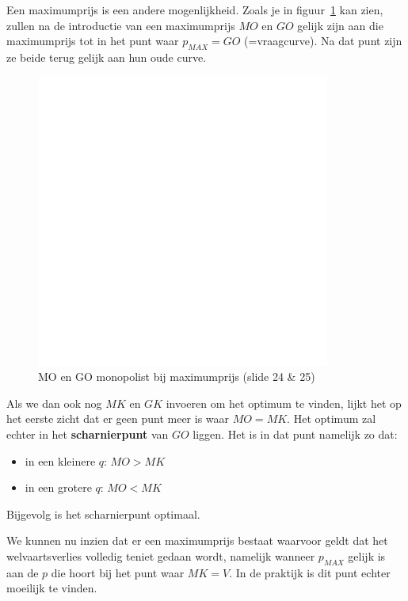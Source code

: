 Een maximumprijs is een andere mogenlijkheid. Zoals je in figuur~\ref{fig:GOMOmonopolistBijMaximumprijs} kan zien, zullen na de introductie van een maximumprijs $MO$ en $GO$ gelijk zijn aan die maximumprijs tot in het punt waar $p_{MAX} = GO$ (=vraagcurve). Na dat punt zijn ze beide terug gelijk aan hun oude curve.

\begin{figure}[htbp]
   \centering
   \includegraphics[scale=0.4]{Images/white.png}
   \caption{MO en GO monopolist bij maximumprijs (slide 24 \& 25)}
   \label{fig:GOMOmonopolistBijMaximumprijs}
\end{figure}

Als we dan ook nog $MK$ en $GK$ invoeren om het optimum te vinden, lijkt het op het eerste zicht dat er geen punt meer is waar $MO = MK$. Het optimum zal echter in het \textbf{scharnierpunt} van $GO$ liggen. Het is in dat punt namelijk zo dat:
\begin{itemize}
   \item in een kleinere $q$: $MO > MK$
   \item in een grotere $q$: $MO < MK$
\end{itemize}
Bijgevolg is het scharnierpunt optimaal.

We kunnen nu inzien dat er een maximumprijs bestaat waarvoor geldt dat het welvaartsverlies volledig teniet gedaan wordt, namelijk wanneer $p_{MAX}$ gelijk is aan de $p$ die hoort bij het punt waar $MK = V$. In de praktijk is dit punt echter moeilijk te vinden.

